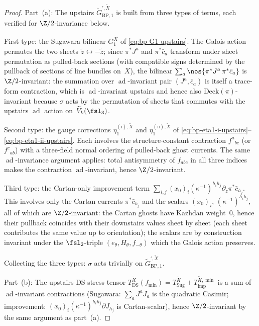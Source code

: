 \begin{proof}
Part~(a): The upstairs $\widetilde G^{\prime, \widetilde X}_{\mathrm{BP}, 1}$
is built from three types of terms, each verified for
$\Z/2$-invariance below.

First type: the Sugawara bilinear $G_1^{\widetilde X}$ of
\eqref{eq:bp-G1-upstairs}. The Galois action permutes the two
sheets $\tilde z \leftrightarrow -\tilde z$; since $\pi^{\ast}J^a$
and $\pi^{\ast}\bar c_a$ transform under sheet permutation as
pulled-back sections (with compatible signs determined by the
pullback of sections of line bundles on~$X$), the bilinear
$\sum_a \nos{\pi^{\ast}J^a\, \pi^{\ast}\bar c_a}$ is
$\Z/2$-invariant: the summation over
$\operatorname{ad}$-invariant pair $(J^a, \bar c_a)$ is itself a
trace-form contraction, which is
$\operatorname{ad}$-invariant upstairs and hence also
$\mathrm{Deck}(\pi)$-invariant because $\sigma$ acts by the
permutation of sheets that commutes with the upstairs
$\operatorname{ad}$ action on~$\widetilde V_k(\fsl_3)$.

Second type: the gauge corrections $\eta_1^{(\mathrm i), \widetilde X}$
and $\eta_1^{(\mathrm{ii}), \widetilde X}$ of
\eqref{eq:bp-eta1-i-upstairs}--\eqref{eq:bp-eta1-ii-upstairs}.
Each involves the structure-constant contraction
$f^a{}_{bc}$ (or $f^c{}_{ab}$) with a three-field normal ordering
of pulled-back ghost currents. The same
$\operatorname{ad}$-invariance argument applies: total antisymmetry
of $f_{abc}$ in all three indices makes the contraction
$\operatorname{ad}$-invariant, hence $\Z/2$-invariant.

Third type: the Cartan-only improvement term
$\sum_{i,j} (x_0)_i (\kappa^{-1})^{h_i h_j}
 \partial_{\tilde z}\pi^{\ast}\bar c_{h_j}$. This involves only
the Cartan currents $\pi^{\ast}\bar c_{h_j}$ and the scalars
$(x_0)_i$, $(\kappa^{-1})^{h_i h_j}$, all of which are
$\Z/2$-invariant: the Cartan ghosts have Kazhdan weight~$0$, hence
their pullback coincides with their downstairs values sheet by
sheet (each sheet contributes the same value up to orientation); the
scalars are by construction invariant under the $\fsl_2$-triple
$(e_{\theta}, H_{\theta}, f_{-\theta})$ which the Galois action
preserves.

Collecting the three types: $\sigma$ acts trivially on
$\widetilde G^{\prime, \widetilde X}_{\mathrm{BP}, 1}$.

Part~(b): The upstairs DS stress tensor
$T_{\mathrm{DS}}^{\widetilde X}(f_{\min}) = T_{\mathrm{Sug}}^{\widetilde X} + T_{\mathrm{imp}}^{\widetilde X, \min}$
is a sum of $\operatorname{ad}$-invariant contractions (Sugawara:
$\sum_a J^a J_a$ is the quadratic Casimir; improvement:
$(x_0)_i (\kappa^{-1})^{h_i h_j} \partial J_{h_j}$ is
Cartan-scalar), hence $\Z/2$-invariant by the same argument as
part~(a).


\end{proof}
